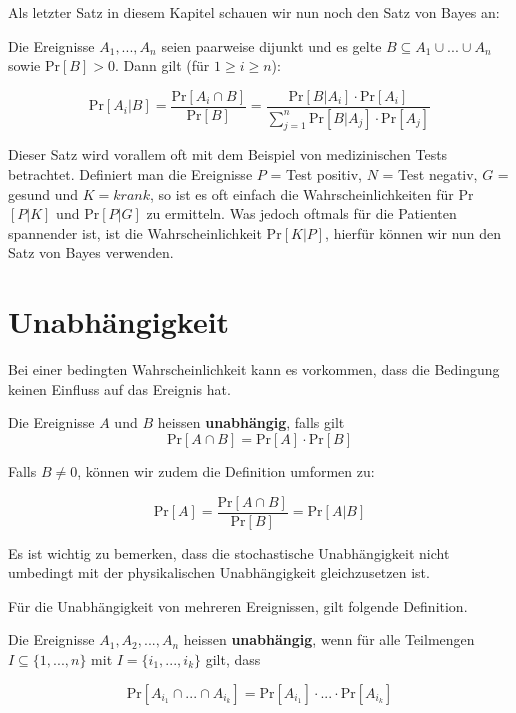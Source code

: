 Als letzter Satz in diesem Kapitel schauen wir nun noch den Satz von Bayes an:

\begin{satz}
    Die Ereignisse $A_1, ... , A_n$ seien paarweise dijunkt und es gelte $B \subseteq A_1 \cup ... \cup A_n$
    sowie Pr$[B] > 0$. Dann gilt (für $1 \geq i \geq n$):

    $$\text{Pr}[A_i | B] = \frac{\text{Pr}[A_i \cap B]}{\text{Pr}[B]} = \frac{\text{Pr}[B | A_i] \cdot \text{Pr}[A_i]}{\sum_{j = 1}^{n}\text{Pr}[B | A_j] \cdot \text{Pr}[A_j]}$$
\end{satz}
\bigskip

Dieser Satz wird vorallem oft mit dem Beispiel von medizinischen Tests betrachtet. Definiert man die
Ereignisse $P$ = Test positiv, $N$ = Test negativ, $G$ = gesund und $K = krank$, so ist es oft einfach
die Wahrscheinlichkeiten für Pr$[P | K]$ und Pr$[P | G]$ zu ermitteln. Was jedoch oftmals für die 
Patienten spannender ist, ist die Wahrscheinlichkeit Pr$[K | P]$, hierfür können wir nun den Satz von
Bayes verwenden.

\section{Unabhängigkeit}

Bei einer bedingten Wahrscheinlichkeit kann es vorkommen, dass die Bedingung keinen Einfluss auf das
Ereignis hat.

\begin{definition}
    Die Ereignisse $A$ und $B$ heissen \textbf{unabhängig}, falls gilt
    $$\text{Pr}[A \cap B] = \text{Pr}[A] \cdot \text{Pr}[B]$$
\end{definition}
\bigskip

Falls $B \neq 0$, können wir zudem die Definition umformen zu:

$$\text{Pr}[A] = \frac{\text{Pr}[A \cap B]}{\text{Pr}[B]} = \text{Pr}[A | B]$$

Es ist wichtig zu bemerken, dass die stochastische Unabhängigkeit nicht umbedingt mit der physikalischen
Unabhängigkeit gleichzusetzen ist.

Für die Unabhängigkeit von mehreren Ereignissen, gilt folgende Definition.

\begin{definition}
    Die Ereignisse $A_1, A_2, ... , A_n$ heissen \textbf{unabhängig}, wenn für alle Teilmengen 
    $I \subseteq \{1, ... , n\}$ mit $I = \{i_1, ... , i_k\}$ gilt, dass

    $$\text{Pr}[A_{i_1} \cap ... \cap A_{i_k}] = \text{Pr}[A_{i_1}] \cdot ... \cdot \text{Pr}[A_{i_k}]$$
\end{definition}
\bigskip

